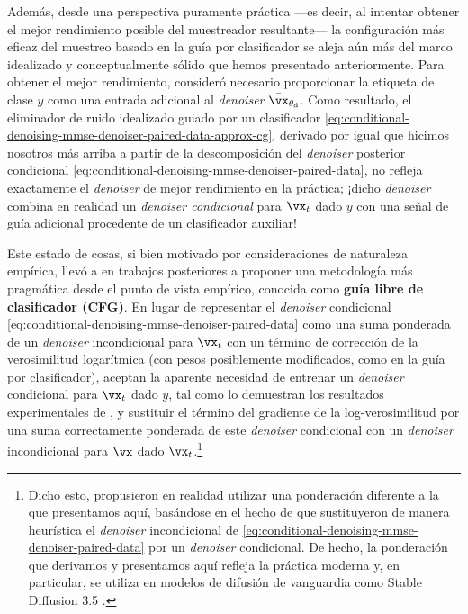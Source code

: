 \documentclass[../../book-main_es.tex]{subfiles}
\begin{document}
Además, desde una perspectiva puramente práctica ---es decir, al intentar obtener el mejor
rendimiento posible del muestreador resultante--- la configuración más eficaz
del muestreo basado en la guía por clasificador se aleja aún más del
marco idealizado y conceptualmente sólido que hemos presentado anteriormente.
Para obtener el mejor rendimiento, \citet{Dhariwal2021-hg} consideró
necesario proporcionar la etiqueta de clase $y$ como una entrada adicional al \textit{denoiser} 
$\bar{\vx}_{\theta_{\mathrm{d}}}$. Como resultado, el eliminador de ruido idealizado guiado por un clasificador
\eqref{eq:conditional-denoising-mmse-denoiser-paired-data-approx-cg},
derivado por \citet{Dhariwal2021-hg} igual que hicimos nosotros más arriba a partir de la descomposición del \textit{denoiser}
posterior condicional \eqref{eq:conditional-denoising-mmse-denoiser-paired-data}, no refleja exactamente
el \textit{denoiser} de mejor rendimiento en la práctica; ¡dicho \textit{denoiser} 
combina en realidad un \textit{denoiser condicional} para $\vx_t$ dado $y$ con una
señal de guía adicional procedente de un clasificador auxiliar!

Este estado de cosas, si bien motivado por consideraciones de naturaleza empírica, llevó a \citet{Ho2022-ry} en
trabajos posteriores a proponer una metodología más pragmática desde el punto de vista empírico, conocida como
\textbf{guía libre de clasificador (CFG)}. En lugar de representar el
\textit{denoiser} condicional
\eqref{eq:conditional-denoising-mmse-denoiser-paired-data} como una suma ponderada
de un \textit{denoiser} incondicional para $\vx_t$ con un término de corrección de la verosimilitud logarítmica
(con pesos posiblemente modificados, como en la guía por clasificador), aceptan la
aparente necesidad de entrenar un \textit{denoiser} condicional para $\vx_t$ dado $y$, tal como
lo demuestran los resultados experimentales de \citet{Dhariwal2021-hg}, y sustituir
el término del gradiente de la log-verosimilitud por una suma correctamente ponderada de este
\textit{denoiser} condicional con un \textit{denoiser} incondicional para $\vx$ dado
$\vx_t$.\footnote{Dicho esto, \textcite{Ho2022-ry} propusieron en realidad utilizar
    una ponderación diferente a la que presentamos aquí, basándose en el hecho de que
    \textcite{Dhariwal2021-hg} sustituyeron de manera heurística el
    \textit{denoiser} incondicional de 
    \eqref{eq:conditional-denoising-mmse-denoiser-paired-data} por
    un \textit{denoiser} condicional. De hecho, la ponderación que derivamos y presentamos aquí
    refleja la práctica moderna y, en particular, se utiliza en modelos de difusión de vanguardia
    como Stable Diffusion 3.5 
\cite{DBLP:conf/icml/EsserKBEMSLLSBP24}.}
\end{document}
